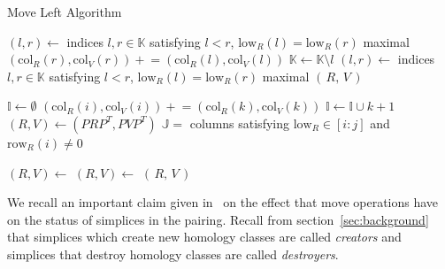 \documentclass[sn-mathphys]{sn-jnl}
\begin{document}
\begin{algorithm}[!htb]
	\caption{Move Left Algorithm}\label{alg:ml}
    \begin{algorithmic}[1]
            \State $(l, r) \gets $ indices $l, r \in \mathbb{K}$ satisfying $l < r$, $\mathrm{low}_R(l) = \mathrm{low}_R(r)$ maximal 
            	\State $(\mathrm{col}_R(r), \mathrm{col}_V(r)) \mathrel{+}= (\mathrm{col}_R(l), \mathrm{col}_V(l))$
            	\State $\mathbb{K} \gets \mathbb{K} \setminus l$
            	\State $(l, r) \gets $ indices $l, r \in \mathbb{K}$ satisfying $l < r$, $\mathrm{low}_R(l) = \mathrm{low}_R(r)$ maximal
            \EndWhile
        	\State \Return $(\, R, \, V \, )$
        \EndFunction
    \end{algorithmic}
    
    \begin{algorithmic}[1]
        	\State $\mathbb{I} \gets \emptyset$
            	\State $(\mathrm{col}_R(i), \mathrm{col}_V(i)) \mathrel{+}= (\mathrm{col}_R(k), \mathrm{col}_V(k))$
            	\State $\mathbb{I} \gets \mathbb{I} \cup k + 1 $
            \EndWhile
            \State $(R, V) \gets (P R P^T, P V P^T)$
            \State $\mathbb{J} = $ columns satisfying $\mathrm{low}_R \in [i:j]$ and $\mathrm{row}_R(i) \neq 0$ %

            \State $(R, V) \gets$ 
            \State $(R, V) \gets$ 
			\State \Return $(\, R, \, V\,)$
        \EndFunction
    \end{algorithmic}

\end{algorithm}
We recall an important claim given in~\cite{busaryev2010tracking} on the effect that move operations have on the status of simplices in the pairing. Recall from section~\ref{sec:background} that simplices which create new homology classes are called \emph{creators} and simplices that destroy homology classes are called \emph{destroyers}.
\end{document}
